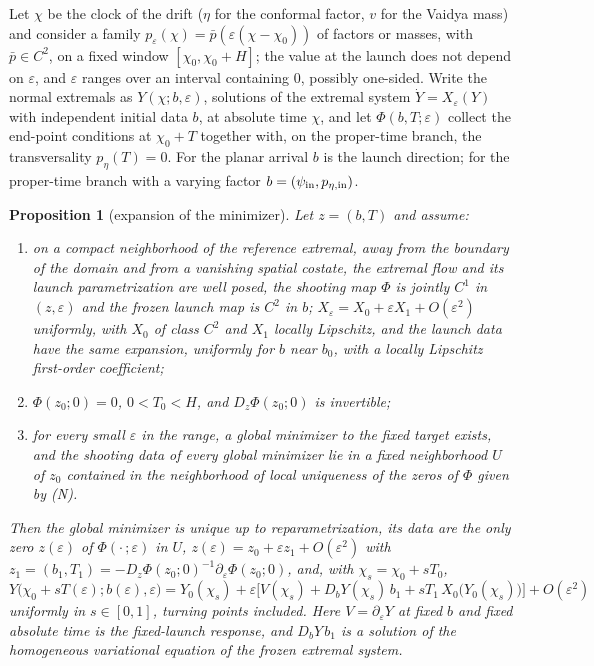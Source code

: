 \documentclass[aip,jmp,amsmath,amssymb,reprint]{revtex4-2}
\theoremstyle{plain}
\newtheorem{proposition}{Proposition}[section]
\theoremstyle{definition}
\begin{document}
Let $\chi$ be the clock of the drift ($\eta$ for the conformal factor, $v$ for the Vaidya mass) and
consider a family $p_\varepsilon(\chi)=\bar p(\varepsilon(\chi-\chi_0))$ of factors or masses, with
$\bar p\in C^2$, on a fixed window $[\chi_0,\chi_0+H]$; the value at the launch does not depend on
$\varepsilon$, and $\varepsilon$ ranges over an interval containing $0$, possibly one-sided. Write the
normal extremals as $Y(\chi;b,\varepsilon)$, solutions of the extremal system $\dot Y=X_\varepsilon(Y)$
with independent initial data $b$, at absolute time $\chi$, and let $\Phi(b,T;\varepsilon)$ collect the
end-point conditions at $\chi_0+T$ together with, on the proper-time branch, the transversality
$p_\eta(T)=0$. For the planar arrival $b$ is the launch direction; for the proper-time branch with a
varying factor $b=(\psi_{\rm in},p_{\eta,{\rm in}})$.

\begin{proposition}[expansion of the minimizer]\label{prop:adiabatic-min}
Let $z=(b,T)$ and assume:
\begin{enumerate}
\item[(R)] on a compact neighborhood of the reference extremal, away from the boundary of the
  domain and from a vanishing spatial costate, the extremal flow and its launch parametrization
  are well posed, the shooting map $\Phi$ is jointly $C^1$ in $(z,\varepsilon)$ and the frozen launch
  map is $C^2$ in $b$; $X_\varepsilon=X_0+\varepsilon X_1+O(\varepsilon^2)$ uniformly, with $X_0$ of
  class $C^2$ and $X_1$ locally Lipschitz, and the launch data have the same expansion, uniformly
  for $b$ near $b_0$, with a locally Lipschitz first-order coefficient;
\item[(N)] $\Phi(z_0;0)=0$, $0<T_0<H$, and $D_z\Phi(z_0;0)$ is invertible;
\item[(S)] for every small $\varepsilon$ in the range, a global minimizer to the fixed target exists,
  and the shooting data of every global minimizer lie in a fixed neighborhood $U$ of $z_0$
  contained in the neighborhood of local uniqueness of the zeros of $\Phi$ given by (N).
\end{enumerate}
Then the global minimizer is unique up to reparametrization, its data are the only zero
$z(\varepsilon)$ of $\Phi(\cdot\,;\varepsilon)$ in $U$, $z(\varepsilon)=z_0+\varepsilon z_1+O(\varepsilon^2)$
with $z_1=(b_1,T_1)=-D_z\Phi(z_0;0)^{-1}\partial_\varepsilon\Phi(z_0;0)$, and, with
$\chi_s=\chi_0+sT_0$,
\[
  Y\big(\chi_0+sT(\varepsilon);b(\varepsilon),\varepsilon\big)
  =Y_0(\chi_s)+\varepsilon\Big[V(\chi_s)+D_bY(\chi_s)\,b_1+sT_1\,X_0\big(Y_0(\chi_s)\big)\Big]
  +O(\varepsilon^2)
\]
uniformly in $s\in[0,1]$, turning points included. Here $V=\partial_\varepsilon Y$ at fixed $b$ and
fixed absolute time is the fixed-launch response, and $D_bY\,b_1$ is a solution of the homogeneous
variational equation of the frozen extremal system.
\end{proposition}
\end{document}
